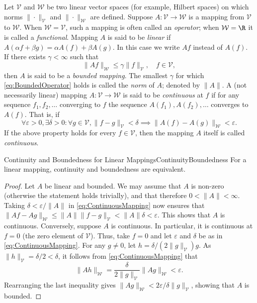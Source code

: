 Let $\mathcal{V}$ and $\mathcal{W}$ be two linear vector spaces (for example, Hilbert spaces) on which norms $\|\cdot\|_{\mathcal{V}}$ and $\|\cdot\|_{\mathcal{W}}$ are defined. Suppose $A : \mathcal{V} \to \mathcal{W}$ is a mapping from $\mathcal{V}$ to $\mathcal{W}$. When $\mathcal{W} = \mathcal{V}$, such a mapping is often called an \textit{operator}; when $\mathcal{W} = \R$ it is called a \textit{functional}. Mapping $A$ is said to be \textit{linear} if $A(\alpha f + \beta g) = \alpha A(f) + \beta A(g)$. In this case we write $Af$ instead of $A(f)$. If there exists $\gamma < \infty$ such that
\begin{equation}
	\|Af\|_{\mathcal{W}} \le \gamma \|f\|_{\mathcal{V}}, \quad f \in \mathcal{V}, \label{eq:BoundedOperator}
\end{equation}
then $A$ is said to be a \textit{bounded mapping}. The smallest $\gamma$ for which \eqref{eq:BoundedOperator} holds is called the \textit{norm} of $A$; denoted by $\|A\|$. A (not necessarily linear) mapping $A : \mathcal{V} \to \mathcal{W}$ is said to be \textit{continuous} at $f$ if for any sequence $f_1, f_2, \dots$ converging to $f$ the sequence $A(f_1), A(f_2), \dots$ converges to $A(f)$. That is, if
\begin{equation}
	\forall \varepsilon > 0, \exists \delta > 0 : \forall g \in \mathcal{V}, \|f - g\|_{\mathcal{V}} < \delta \implies \|A(f) - A(g)\|_{\mathcal{W}} < \varepsilon. \label{eq:ContinuousMapping}
\end{equation}
If the above property holds for every $f \in \mathcal{V}$, then the mapping $A$ itself is called \textit{continuous}.

\begin{thm}{Continuity and Boundedness for Linear Mappings}{ContinuityBoundedness}
	For a linear mapping, continuity and boundedness are equivalent.
\end{thm}

\begin{proof}
	Let $A$ be linear and bounded. We may assume that $A$ is non-zero (otherwise the statement holds trivially), and that therefore $0 < \|A\| < \infty$. Taking $\delta < \varepsilon / \|A\|$ in \eqref{eq:ContinuousMapping} now ensures that $\|Af - Ag\|_{\mathcal{W}} \le \|A\| \|f - g\|_{\mathcal{V}} < \|A\| \delta < \varepsilon$. This shows that $A$ is continuous.
	Conversely, suppose $A$ is continuous. In particular, it is continuous at $f = 0$ (the zero element of $\mathcal{V}$). Thus, take $f = 0$ and let $\varepsilon$ and $\delta$ be as in \eqref{eq:ContinuousMapping}. For any $g \neq 0$, let $h = \delta / (2\|g\|_{\mathcal{V}}) g$. As $\|h\|_{\mathcal{V}} = \delta/2 < \delta$, it follows from \eqref{eq:ContinuousMapping} that
	\begin{equation*}
		\|Ah\|_{\mathcal{W}} = \frac{\delta}{2\|g\|_{\mathcal{V}}} \|Ag\|_{\mathcal{W}} < \varepsilon.
	\end{equation*}
	Rearranging the last inequality gives $\|Ag\|_{\mathcal{W}} < 2\varepsilon / \delta \|g\|_{\mathcal{V}}$, showing that $A$ is bounded.
\end{proof}

